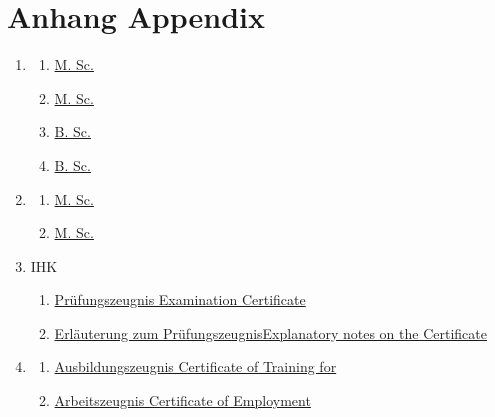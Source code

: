 \section{\ifgerman Anhang \else Appendix \fi}

\bigskip{}

\begin{enumerate}
  \item \fhac
    \begin{enumerate}
      \item \hyperlink{certificates/Masterzeugnis_compressed.pdf.1}{\report{} M. Sc.}
      \item \hyperlink{certificates/Masterurkunde_compressed.pdf.1}{\certificate{} M. Sc.}
      \item \hyperlink{certificates/Bachelorzeugnis_compressed.pdf.1}{\report{} B. Sc.}
      \item \hyperlink{certificates/Bachelorurkunde_compressed.pdf.1}{\certificate{} B. Sc.}
    \end{enumerate}

  \item \uwm
    \begin{enumerate}
      \item \hyperlink{certificates/UWM_Diploma_page_1_compressed.pdf.1}{\diploma{} M. Sc.}
      \item \hyperlink{certificates/UWM_Transcript.pdf.1}{\transcript{} M. Sc.}
    \end{enumerate}

  \item IHK
    \begin{enumerate}
      \item \hyperlink{certificates/IHK_Pruefungszeugnis_compressed.pdf.1}{\ifgerman Prüfungszeugnis \else Examination Certificate \fi \matse}
      \item \hyperlink{certificates/IHK_Pruefungszeugnis_compressed.pdf.2}{\ifgerman Erläuterung zum Prüfungszeugnis\else Explanatory notes on the Certificate\fi}
    \end{enumerate}

  \item \cae
    \begin{enumerate}
      \item \hyperlink{certificates/Ausbildungszeugnis_CAE.pdf.1}{\ifgerman Ausbildungszeugnis \else Certificate of Training for \fi \matse}
      \item \hyperlink{certificates/Arbeitszeugnis_CAE.pdf.1}{\ifgerman Arbeitszeugnis \else Certificate of Employment \fi \matse}
    \end{enumerate}

\end{enumerate}

